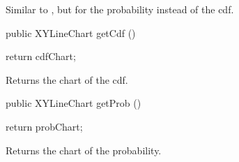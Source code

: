 \begin{tabb}
   Similar to , but for the probability instead
   of the cdf.
\end{tabb}
\begin{htmlonly}
\end{htmlonly}
\begin{code}

   public XYLineChart getCdf () \begin{hide} {
      return cdfChart;
   }\end{hide}
\end{code}
\begin{tabb}
   Returns the chart of the cdf.
\end{tabb}
\begin{htmlonly}
\end{htmlonly}
\begin{code}

   public XYLineChart getProb () \begin{hide} {
      return probChart;
   }\end{hide}
\end{code}
\begin{tabb}
   Returns the chart of the probability.
\end{tabb}
\begin{htmlonly}
\end{htmlonly}
\begin{code}
\begin{hide}
}\end{hide}
\end{code}
